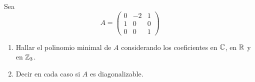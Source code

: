 \item Sea \[A=\begin{pmatrix}
        0&-2&1\\1&0&0\\0&0&1
    \end{pmatrix}\]
    \begin{enumerate}
        \item Hallar el polinomio minimal de $A$ considerando los coeficientes en $\mathbb{C}$, en $\mathbb{R}$ y en $\mathbb{Z}_3$.
            \begin{mdframed}[style=s]
                
            \end{mdframed}
        \item Decir en cada caso si $A$ es diagonalizable.
            \begin{mdframed}[style=s]
                
            \end{mdframed}
    \end{enumerate}